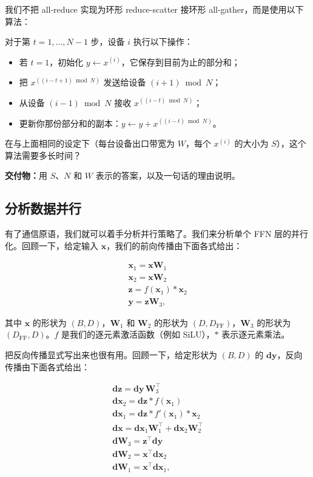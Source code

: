 我们不把 all-reduce 实现为环形 reduce-scatter 接环形 all-gather，而是使用以下算法：

对于第 $t=1,\ldots,N-1$ 步，设备 $i$ 执行以下操作：

\begin{itemize}
  \item 若 $t=1$，初始化 $y \leftarrow x^{(i)}$，它保存到目前为止的部分和；
  \item 把 $x^{((i-t+1)\bmod N)}$ 发送给设备 $(i+1)\bmod N$；
  \item 从设备 $(i-1)\bmod N$ 接收 $x^{((i-t)\bmod N)}$；
  \item 更新你那份部分和的副本：$y \leftarrow y + x^{((i-t)\bmod N)}$。
\end{itemize}

在与上面相同的设定下（每台设备出口带宽为 $W$，每个 $x^{(i)}$ 的大小为 $S$），这个算法需要多长时间？

\textbf{交付物：}用 $S$、$N$ 和 $W$ 表示的答案，以及一句话的理由说明。

\subsection{分析数据并行}

有了通信原语，我们就可以着手分析并行策略了。我们来分析单个 FFN 层的并行化。回顾一下，给定输入 $\boldsymbol{x}$，我们的前向传播由下面各式给出：

\begin{gather}
\boldsymbol{x}_1 = \boldsymbol{x}\boldsymbol{W}_1 \tag{20}\\
\boldsymbol{x}_2 = \boldsymbol{x}\boldsymbol{W}_2 \tag{21}\\
\boldsymbol{z} = f(\boldsymbol{x}_1) * \boldsymbol{x}_2 \tag{22}\\
\boldsymbol{y} = \boldsymbol{z}\boldsymbol{W}_3, \tag{23}
\end{gather}

其中 $\boldsymbol{x}$ 的形状为 $(B,D)$，$\boldsymbol{W}_1$ 和 $\boldsymbol{W}_2$ 的形状为 $(D,D_{\mathrm{FF}})$，$\boldsymbol{W}_3$ 的形状为 $(D_{\mathrm{FF}},D)$。$f$ 是我们的逐元素激活函数（例如 SiLU），$*$ 表示逐元素乘法。

把反向传播显式写出来也很有用。回顾一下，给定形状为 $(B,D)$ 的 $\boldsymbol{dy}$，反向传播由下面各式给出：

\begin{gather}
\boldsymbol{dz} = \boldsymbol{dy}\,\boldsymbol{W}_3^{\top} \tag{24}\\
\boldsymbol{dx}_2 = \boldsymbol{dz} * f(\boldsymbol{x}_1) \tag{25}\\
\boldsymbol{dx}_1 = \boldsymbol{dz} * f'(\boldsymbol{x}_1) * \boldsymbol{x}_2 \tag{26}\\
\boldsymbol{dx} = \boldsymbol{dx}_1\boldsymbol{W}_1^{\top} + \boldsymbol{dx}_2\boldsymbol{W}_2^{\top} \tag{27}\\
\boldsymbol{dW}_3 = \boldsymbol{z}^{\top}\boldsymbol{dy} \tag{28}\\
\boldsymbol{dW}_2 = \boldsymbol{x}^{\top}\boldsymbol{dx}_2 \tag{29}\\
\boldsymbol{dW}_1 = \boldsymbol{x}^{\top}\boldsymbol{dx}_1, \tag{30}
\end{gather}

